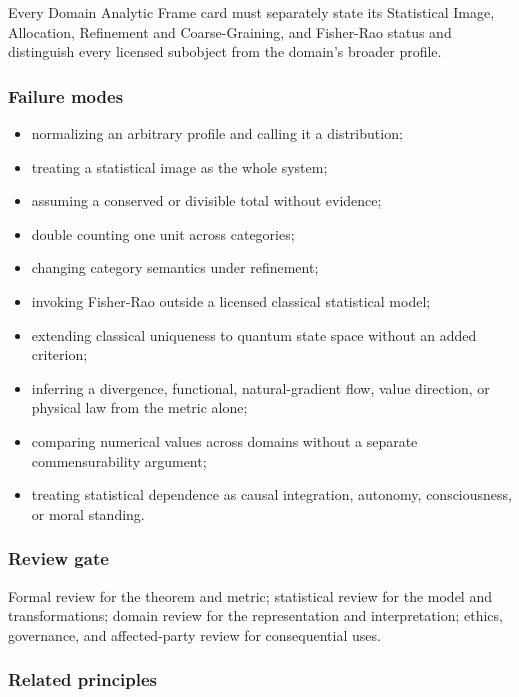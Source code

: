 \documentclass[
  11pt,
]{article}
\providecommand{\tightlist}{%
  \setlength{\itemsep}{0pt}\setlength{\parskip}{0pt}}
\begin{document}
Every Domain Analytic Frame card must separately state its Statistical
Image, Allocation, Refinement and Coarse-Graining, and Fisher-Rao status
and distinguish every licensed subobject from the domain's broader
profile.

\subsubsection{Failure modes}\label{failure-modes-13}

\begin{itemize}
\tightlist
\item
  normalizing an arbitrary profile and calling it a distribution;
\item
  treating a statistical image as the whole system;
\item
  assuming a conserved or divisible total without evidence;
\item
  double counting one unit across categories;
\item
  changing category semantics under refinement;
\item
  invoking Fisher-Rao outside a licensed classical statistical model;
\item
  extending classical uniqueness to quantum state space without an added
  criterion;
\item
  inferring a divergence, functional, natural-gradient flow, value
  direction, or physical law from the metric alone;
\item
  comparing numerical values across domains without a separate
  commensurability argument;
\item
  treating statistical dependence as causal integration, autonomy,
  consciousness, or moral standing.
\end{itemize}

\subsubsection{Review gate}\label{review-gate-5}

Formal review for the theorem and metric; statistical review for the
model and transformations; domain review for the representation and
interpretation; ethics, governance, and affected-party review for
consequential uses.

\subsubsection{Related principles}\label{related-principles-5}
\end{document}

